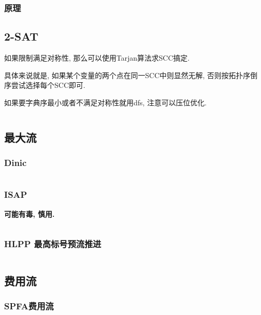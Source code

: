 \documentclass[a4paper, twoside]{article}
\begin{document}
\begin{multicols}{2}
				\subsubsection{原理}
					

			
			

			\subsection{2-SAT}
				如果限制满足对称性, 那么可以使用Tarjan算法求SCC搞定. 
				
				具体来说就是, 如果某个变量的两个点在同一SCC中则显然无解, 否则按拓扑序倒序尝试选择每个SCC即可.

				如果要字典序最小或者不满足对称性就用dfs, 注意可以压位优化.

				\inputminted{cpp}{../src/graph/2sat.cpp}


			\subsection{最大流}
				\subsubsection{Dinic}
					\inputminted{cpp}{../src/graph/Dinic.cpp}

				\subsubsection{ISAP}
					\textbf{可能有毒, 慎用.}
					\inputminted{cpp}{../src/graph/ISAP.cpp}

				\subsubsection{HLPP 最高标号预流推进}
					\inputminted{cpp}{../src/graph/HLPP.cpp}
			
			\subsection{费用流}
				\subsubsection{SPFA费用流}
					\inputminted{cpp}{../src/graph/SPFA费用流.cpp}


\end{multicols}
\end{document}
